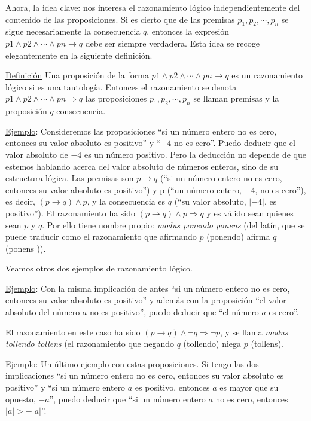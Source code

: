 Ahora, la idea clave: nos interesa el razonamiento lógico independientemente del contenido de las proposiciones. Si es cierto que de las premisas  $p_1, p_2, \cdots , p_n$  se sigue necesariamente la consecuencia $q$, entonces la expresión $ p1 \wedge p2 \wedge \cdots \wedge pn \to  q$ debe ser siempre verdadera. Esta idea se recoge elegantemente en la siguiente definición.

\underline{Definición} Una proposición de la forma $ p1 \wedge p2 \wedge \cdots \wedge pn \to  q$  es un razonamiento lógico si es una tautología. Entonces el razonamiento se denota $ p1 \wedge p2 \wedge \cdots \wedge pn \Rightarrow  q$  las proposiciones $p_1, p_2, \cdots , p_n$  se llaman premisas y la proposición $q$ consecuencia.

\underline{Ejemplo}: Consideremos las proposiciones “si un número entero no es cero, entonces su valor absoluto es positivo” y “$-4$ no es cero”. Puedo deducir que el valor absoluto de $-4$ es un número positivo. Pero la deducción no depende de que estemos hablando acerca del valor absoluto de números enteros, sino de su estructura lógica. Las premisas son $p \to  q$ (“si un número entero no es cero, entonces su valor absoluto es positivo”) y p (“un número entero, $-4$, no es cero”), es decir, $(p \to  q) \wedge p$, y la consecuencia es $q$ (“su valor absoluto, $| - 4|$, es positivo”). El razonamiento ha sido $(p \to  q) \wedge p \Rightarrow q$ y es válido sean quienes sean $p$ y $q$. Por ello tiene nombre propio: \emph{modus ponendo ponens} (del latín, que se puede traducir como el razonamiento que afirmando $p$ (ponendo) afirma $q$ (ponens )).

Veamos otros dos ejemplos de razonamiento lógico.

\underline{Ejemplo}: Con la misma implicación de antes “si un número entero no es cero, entonces su valor absoluto es positivo” y además con la proposición “el valor absoluto del número $a$ no es positivo”, puedo deducir que “el número $a$ es cero”.

El razonamiento en este caso ha sido $(p \to q) \wedge \neg q \Rightarrow  \neg p$, y se llama \emph{modus tollendo tollens} (el razonamiento que negando $q$ (tollendo) niega $p$ (tollens).

\underline{Ejemplo}: Un último ejemplo con estas proposiciones. Si tengo las dos implicaciones “si un número entero no es cero, entonces su valor absoluto es positivo” y “si un número entero $a$ es positivo, entonces $a$ es mayor que su opuesto, $-a$”, puedo deducir que “si un número entero $a$ no es cero, entonces $|a| > -|a|$”.

